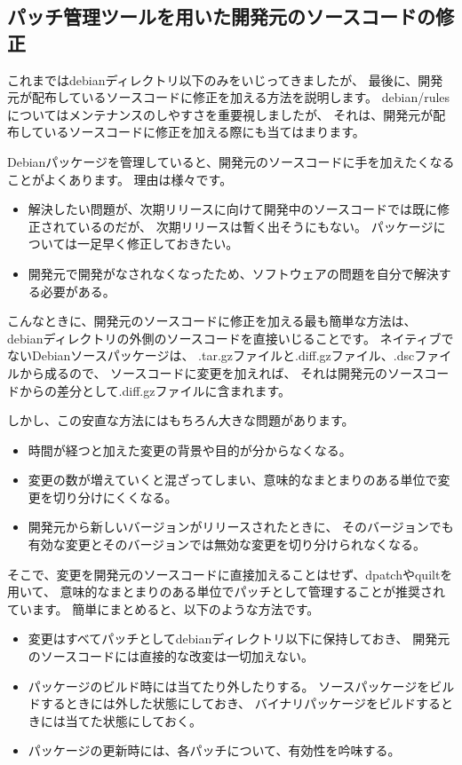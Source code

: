 \documentclass[mingoth,a4paper]{jsarticle}
\begin{document}
\subsection{パッチ管理ツールを用いた開発元のソースコードの修正}

これまではdebianディレクトリ以下のみをいじってきましたが、
最後に、開発元が配布しているソースコードに修正を加える方法を説明します。
debian/rulesについてはメンテナンスのしやすさを重要視しましたが、
それは、開発元が配布しているソースコードに修正を加える際にも当てはまります。

Debianパッケージを管理していると、開発元のソースコードに手を加えたくなることがよくあります。
理由は様々です。

\begin{itemize}
 \item 解決したい問題が、次期リリースに向けて開発中のソースコードでは既に修正されているのだが、
  次期リリースは暫く出そうにもない。
  パッケージについては一足早く修正しておきたい。
 \item 開発元で開発がなされなくなったため、ソフトウェアの問題を自分で解決する必要がある。
\end{itemize}

こんなときに、開発元のソースコードに修正を加える最も簡単な方法は、
debianディレクトリの外側のソースコードを直接いじることです。
ネイティブでないDebianソースパッケージは、
.tar.gzファイルと.diff.gzファイル、.dscファイルから成るので、
ソースコードに変更を加えれば、
それは開発元のソースコードからの差分として.diff.gzファイルに含まれます。

しかし、この安直な方法にはもちろん大きな問題があります。

\begin{itemize}
 \item 時間が経つと加えた変更の背景や目的が分からなくなる。
 \item 変更の数が増えていくと混ざってしまい、意味的なまとまりのある単位で変更を切り分けにくくなる。
 \item 開発元から新しいバージョンがリリースされたときに、
  そのバージョンでも有効な変更とそのバージョンでは無効な変更を切り分けられなくなる。
\end{itemize}

そこで、変更を開発元のソースコードに直接加えることはせず、dpatchやquiltを用いて、
意味的なまとまりのある単位でパッチとして管理することが推奨されています。
簡単にまとめると、以下のような方法です。

\begin{itemize}
 \item 変更はすべてパッチとしてdebianディレクトリ以下に保持しておき、
  開発元のソースコードには直接的な改変は一切加えない。
 \item パッケージのビルド時には当てたり外したりする。
  ソースパッケージをビルドするときには外した状態にしておき、
  バイナリパッケージをビルドするときには当てた状態にしておく。
 \item パッケージの更新時には、各パッチについて、有効性を吟味する。
\end{itemize}
\end{document}
